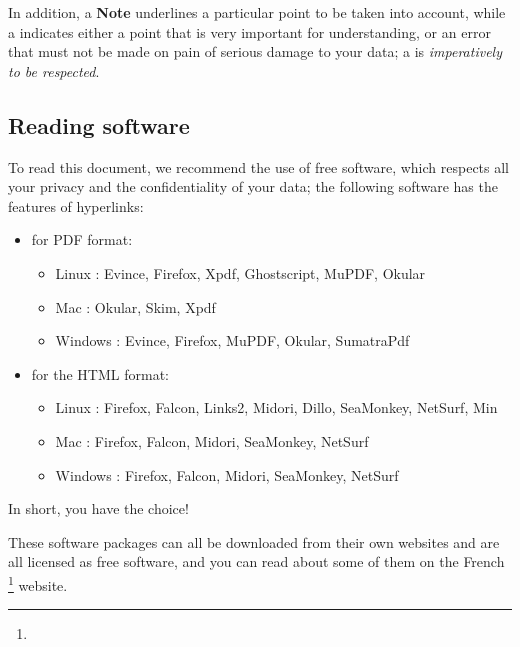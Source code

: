 


In addition, a \textbf{Note} underlines a particular point to be taken into account, while a \textcolor{red}{} indicates either a point that is very important for understanding, or an error that must not be made on pain of serious damage to your data; a \textcolor{red}{} is \emph{imperatively to be respected}.

\subsection{Reading software \label{introduction-manual-readers}}

To read this document, we recommend the use of free software, which respects all your privacy and the confidentiality of your data; the following software has the features of \gls{hyperlinks}:

\begin{itemize}
	\item for \gls{PDF} format:
	\begin{itemize}
		\item[\textopenbullet] Linux : Evince, Firefox, Xpdf, Ghostscript, MuPDF, Okular
		\item[\textopenbullet] Mac : Okular, Skim, Xpdf
		\item[\textopenbullet] Windows : Evince, Firefox, MuPDF, Okular, SumatraPdf
	\end{itemize}
	\item for the \gls{HTML} format:
	\begin{itemize}
		\item[\textopenbullet] Linux : Firefox, Falcon, Links2, Midori, Dillo, SeaMonkey, NetSurf, Min
		\item[\textopenbullet] Mac : Firefox, Falcon, Midori, SeaMonkey, NetSurf
		\item[\textopenbullet] Windows : Firefox, Falcon, Midori, SeaMonkey, NetSurf
	\end{itemize}
\end{itemize}



In short, you have the choice!



These software packages can all be downloaded from their own websites and are all licensed as \gls{free software}, and you can read about some of them on the French \footnote{\urlFramasoftLogiciels{}} website.

